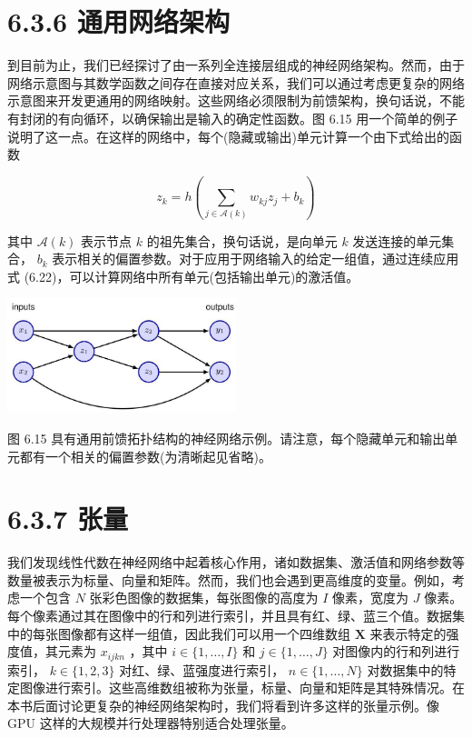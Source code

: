 \documentclass[10pt]{article}
\begin{document}
\section*{6.3.6 通用网络架构}

到目前为止，我们已经探讨了由一系列全连接层组成的神经网络架构。然而，由于网络示意图与其数学函数之间存在直接对应关系，我们可以通过考虑更复杂的网络示意图来开发更通用的网络映射。这些网络必须限制为前馈架构，换句话说，不能有封闭的有向循环，以确保输出是输入的确定性函数。图 6.15 用一个简单的例子说明了这一点。在这样的网络中，每个(隐藏或输出)单元计算一个由下式给出的函数

\[
{z}_{k} = h\left( {\mathop{\sum }\limits_{{j \in  \mathcal{A}\left( k\right) }}{w}_{kj}{z}_{j} + {b}_{k}}\right)  \tag{6.22}
\]

其中 \(\mathcal{A}\left( k\right)\) 表示节点 \(k\) 的祖先集合，换句话说，是向单元 \(k\) 发送连接的单元集合， \({b}_{k}\) 表示相关的偏置参数。对于应用于网络输入的给定一组值，通过连续应用式 (6.22)，可以计算网络中所有单元(包括输出单元)的激活值。

\begin{center}
\includegraphics[max width=0.5\textwidth]{images/0194e279-9b28-703a-88f4-c3ac21e2010d_213_820_351_722_361_0.jpg}
\end{center}
\hspace*{3em} 

图 6.15 具有通用前馈拓扑结构的神经网络示例。请注意，每个隐藏单元和输出单元都有一个相关的偏置参数(为清晰起见省略)。

\section*{6.3.7 张量}

我们发现线性代数在神经网络中起着核心作用，诸如数据集、激活值和网络参数等数量被表示为标量、向量和矩阵。然而，我们也会遇到更高维度的变量。例如，考虑一个包含 \(N\) 张彩色图像的数据集，每张图像的高度为 \(I\) 像素，宽度为 \(J\) 像素。每个像素通过其在图像中的行和列进行索引，并且具有红、绿、蓝三个值。数据集中的每张图像都有这样一组值，因此我们可以用一个四维数组 \(\mathbf{X}\) 来表示特定的强度值，其元素为 \({x}_{ijkn}\) ，其中 \(i \in  \{ 1,\ldots ,I\}\) 和 \(j \in  \{ 1,\ldots ,J\}\) 对图像内的行和列进行索引， \(k \in  \{ 1,2,3\}\) 对红、绿、蓝强度进行索引， \(n \in  \{ 1,\ldots ,N\}\) 对数据集中的特定图像进行索引。这些高维数组被称为张量，标量、向量和矩阵是其特殊情况。在本书后面讨论更复杂的神经网络架构时，我们将看到许多这样的张量示例。像 GPU 这样的大规模并行处理器特别适合处理张量。
\end{document}
